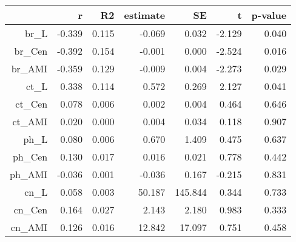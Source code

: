 \begin{table}[ht]
\centering
\begin{tabular}{rrrrrrr}
  \hline
 & r & R2 & estimate & SE & t & p-value \\ 
  \hline
br\_L & -0.339 & 0.115 & -0.069 & 0.032 & -2.129 & 0.040 \\ 
  br\_Cen & -0.392 & 0.154 & -0.001 & 0.000 & -2.524 & 0.016 \\ 
  br\_AMI & -0.359 & 0.129 & -0.009 & 0.004 & -2.273 & 0.029 \\ 
  ct\_L & 0.338 & 0.114 & 0.572 & 0.269 & 2.127 & 0.041 \\ 
  ct\_Cen & 0.078 & 0.006 & 0.002 & 0.004 & 0.464 & 0.646 \\ 
  ct\_AMI & 0.020 & 0.000 & 0.004 & 0.034 & 0.118 & 0.907 \\ 
  ph\_L & 0.080 & 0.006 & 0.670 & 1.409 & 0.475 & 0.637 \\ 
  ph\_Cen & 0.130 & 0.017 & 0.016 & 0.021 & 0.778 & 0.442 \\ 
  ph\_AMI & -0.036 & 0.001 & -0.036 & 0.167 & -0.215 & 0.831 \\ 
  cn\_L & 0.058 & 0.003 & 50.187 & 145.844 & 0.344 & 0.733 \\ 
  cn\_Cen & 0.164 & 0.027 & 2.143 & 2.180 & 0.983 & 0.333 \\ 
  cn\_AMI & 0.126 & 0.016 & 12.842 & 17.097 & 0.751 & 0.458 \\ 
   \hline
\end{tabular}
\end{table}
